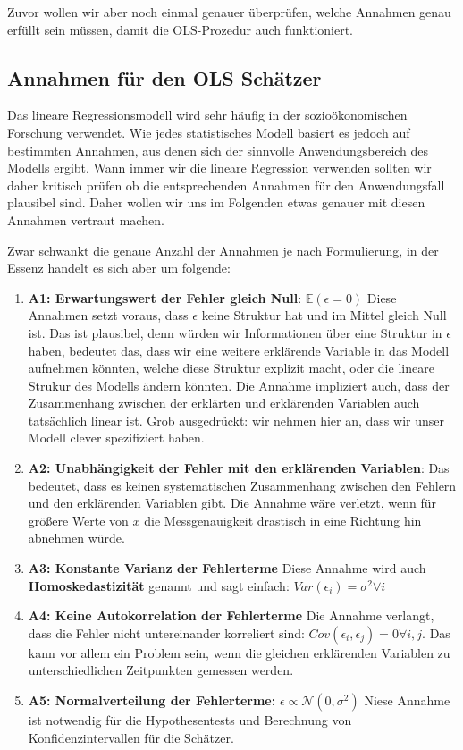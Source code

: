 \documentclass[]{book}
\begin{document}
Zuvor wollen wir aber noch einmal genauer überprüfen, welche Annahmen
genau erfüllt sein müssen, damit die OLS-Prozedur auch funktioniert.

\subsection{Annahmen für den OLS
Schätzer}\label{annahmen-fur-den-ols-schatzer}

Das lineare Regressionsmodell wird sehr häufig in der sozioökonomischen
Forschung verwendet. Wie jedes statistisches Modell basiert es jedoch
auf bestimmten Annahmen, aus denen sich der sinnvolle Anwendungsbereich
des Modells ergibt. Wann immer wir die lineare Regression verwenden
sollten wir daher kritisch prüfen ob die entsprechenden Annahmen für den
Anwendungsfall plausibel sind. Daher wollen wir uns im Folgenden etwas
genauer mit diesen Annahmen vertraut machen.

Zwar schwankt die genaue Anzahl der Annahmen je nach Formulierung, in
der Essenz handelt es sich aber um folgende:

\begin{enumerate}
\def\labelenumi{\arabic{enumi}.}
\item
  \textbf{A1: Erwartungswert der Fehler gleich Null}:
  \(\mathbb{E}(\epsilon=0)\) Diese Annahmen setzt voraus, dass
  \(\epsilon\) keine Struktur hat und im Mittel gleich Null ist. Das ist
  plausibel, denn würden wir Informationen über eine Struktur in
  \(\epsilon\) haben, bedeutet das, dass wir eine weitere erklärende
  Variable in das Modell aufnehmen könnten, welche diese Struktur
  explizit macht, oder die lineare Strukur des Modells ändern könnten.
  Die Annahme impliziert auch, dass der Zusammenhang zwischen der
  erklärten und erklärenden Variablen auch tatsächlich linear ist. Grob
  ausgedrückt: wir nehmen hier an, dass wir unser Modell clever
  spezifiziert haben.
\item
  \textbf{A2: Unabhängigkeit der Fehler mit den erklärenden Variablen}:
  Das bedeutet, dass es keinen systematischen Zusammenhang zwischen den
  Fehlern und den erklärenden Variablen gibt. Die Annahme wäre verletzt,
  wenn für größere Werte von \(x\) die Messgenauigkeit drastisch in eine
  Richtung hin abnehmen würde.
\item
  \textbf{A3: Konstante Varianz der Fehlerterme} Diese Annahme wird auch
  \textbf{Homoskedastizität} genannt und sagt einfach:
  \(Var(\epsilon_i)=\sigma^2\forall i\)
\item
  \textbf{A4: Keine Autokorrelation der Fehlerterme} Die Annahme
  verlangt, dass die Fehler nicht untereinander korreliert sind:
  \(Cov(\epsilon_i, \epsilon_j)=0 \forall i,j\). Das kann vor allem ein
  Problem sein, wenn die gleichen erklärenden Variablen zu
  unterschiedlichen Zeitpunkten gemessen werden.
\item
  \textbf{A5: Normalverteilung der Fehlerterme:}
  \(\epsilon\propto\mathcal{N}(0,\sigma^2)\) Niese Annahme ist notwendig
  für die Hypothesentests und Berechnung von Konfidenzintervallen für
  die Schätzer.
\end{enumerate}
\end{document}

